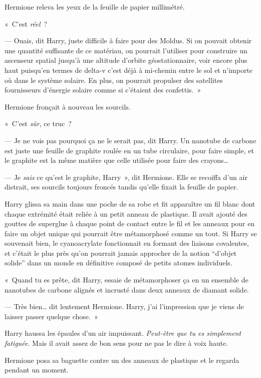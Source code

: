 Hermione releva les yeux de la feuille de papier millimétré.

«~C'est \emph{réel}~?

--- Ouais, dit Harry, juste difficile à faire pour des Moldus.
Si on pouvait obtenir une quantité suffisante de ce matériau, on pourrait l'utiliser pour construire un ascenseur spatial jusqu'à une altitude d'orbite géostationnaire, voir encore plus haut puisqu'en termes de delta-v c'est déjà à mi-chemin entre le sol et n'importe où dans le système solaire.
En plus, on pourrait propulser des satellites fournisseurs d'énergie solaire comme si c'étaient des confettis.~»

Hermione fronçait à nouveau les sourcils.

«~C'est \emph{sûr}, ce truc~?

--- Je ne vois pas pourquoi ça ne le serait pas, dit Harry.
Un nanotube de carbone est juste une feuille de graphite roulée en un tube circulaire, pour faire simple, et le graphite est la même matière que celle utilisée pour faire des crayons…

--- Je \emph{sais} ce qu'est le graphite, Harry~», dit Hermione.
Elle se recoiffa d'un air distrait, ses sourcils toujours froncés tandis qu'elle fixait la feuille de papier.

Harry glissa sa main dans une poche de sa robe et fit apparaître un fil blanc dont chaque extrémité était reliée à un petit anneau de plastique.
Il avait ajouté des gouttes de superglue à chaque point de contact entre le fil et les anneaux pour en faire un objet unique qui pourrait être métamorphosé comme un tout.
Si Harry se souvenait bien, le cyanoacrylate fonctionnait en formant des liaisons covalentes, et c'était le plus près qu'on pourrait jamais approcher de la notion “d'objet solide” dans un monde en définitive composé de petits atomes individuels.

«~Quand tu es prête, dit Harry, essaie de métamorphoser ça en un ensemble de nanotubes de carbone alignés et incrusté dans deux anneaux de diamant solide.

--- Très bien… dit lentement Hermione.
Harry, j'ai l'impression que je viens de laisser passer quelque chose.~»

Harry haussa les épaules d'un air impuissant.
\emph{Peut-être que tu es simplement fatiguée}.
Mais il avait assez de bon sens pour ne pas le dire à voix haute.

Hermione posa sa baguette contre un des anneaux de plastique et le regarda pendant un moment.

